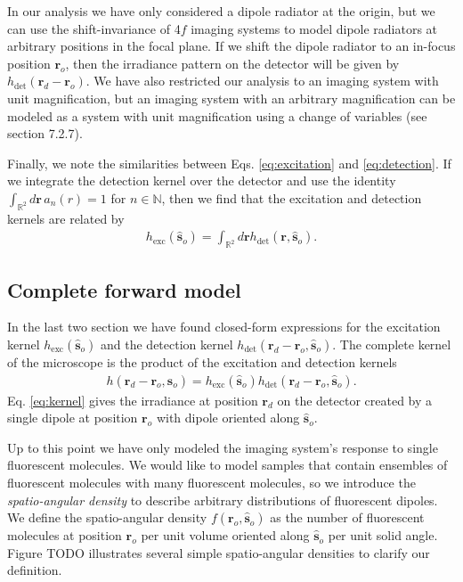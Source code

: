 \documentclass{osa-article}
\providecommand{\mb}[1]{\mathbf{#1}}
\providecommand{\ro}[1]{\mathbf{\mathbf{r}}_o}
\providecommand{\so}[1]{\mathbf{\hat{s}}_o}
\providecommand{\rd}[1]{\mathbf{r}_d}
\providecommand{\mbb}[1]{\mathbb{#1}}
\begin{document}
In our analysis we have only considered a dipole radiator at the origin, but we
can use the shift-invariance of 4$f$ imaging systems to model dipole radiators
at arbitrary positions in the focal plane. If we shift the dipole radiator to an
in-focus position $\ro{}$, then the irradiance pattern on the detector will be
given by $h_{\text{det}}(\rd{} - \ro{})$. We have also restricted our analysis
to an imaging system with unit magnification, but an imaging system with an
arbitrary magnification can be modeled as a system with unit magnification using
a change of variables (see \cite{barrett2004} section 7.2.7).

Finally, we note the similarities between Eqs. \ref{eq:excitation} and
\ref{eq:detection}. If we integrate the detection kernel over the detector and
use the identity $\int_{\mbb{R}^2}d\mb{r}\, a_n(r) = 1$ for $n \in \mbb{N}$,
then we find that the excitation and detection kernels are related by
\begin{align}
  h_{\text{exc}}(\so{}) = \int_{\mbb{R}^2}d\mb{r} h_{\text{det}}(\mb{r}, \so{}).
\end{align}

\subsection{Complete forward model}
In the last two section we have found closed-form expressions for the excitation
kernel $h_{\text{exc}}(\so{})$ and the detection kernel
$h_{\text{det}}(\rd{} - \ro{}, \so{})$. The complete kernel of the microscope is
the product of the excitation and detection kernels
\begin{align}
  h(\rd{} - \ro{}, \so{}) = h_{\text{exc}}(\so{})h_{\text{det}}(\rd{} - \ro{}, \so{}). \label{eq:kernel}
\end{align}
Eq. \ref{eq:kernel} gives the irradiance at position $\rd{}$ on the detector
created by a single dipole at position $\ro{}$ with dipole oriented along
$\so{}$. 

Up to this point we have only modeled the imaging system's response to single
fluorescent molecules. We would like to model samples that contain ensembles of
fluorescent molecules with many fluorescent molecules, so we introduce the
\textit{spatio-angular density} to describe arbitrary distributions of
fluorescent dipoles. We define the spatio-angular density $f(\ro{}, \so{})$ as
the number of fluorescent molecules at position $\ro{}$ per unit volume oriented
along $\so{}$ per unit solid angle. Figure TODO illustrates several simple
spatio-angular densities to clarify our definition.
\end{document}
